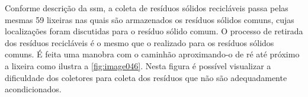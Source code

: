 		
	Conforme descrição da \gls{ssm}, a coleta de resíduos sólidos recicláveis passa pelas mesmas 59 lixeiras nas quais são armazenados os resíduos sólidos comuns, cujas localizações foram discutidas para o resíduo sólido comum.
	O processo de retirada dos resíduos recicláveis é o mesmo que o realizado para os resíduos sólidos comuns. É feita uma manobra com o caminhão aproximando-o de ré até próximo a lixeira como ilustra a \autoref{fig:image046}. Nesta figura é possível visualizar a dificuldade dos coletores para coleta dos resíduos que não são adequadamente acondicionados.
	
